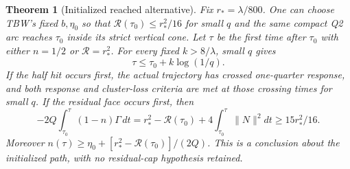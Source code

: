 \documentclass[11pt]{article}
\newtheorem{theorem}{Theorem}\newcommand{\E}{\mathbb E}
\begin{document}
\begin{theorem}[Initialized reached alternative]\label{an04rqtv1:alternative}
Fix $r_*=\lambda/800$. One can choose TBW's fixed $b,\eta_0$ so
that $\mathcal R(\tau_0)\le r_*^2/16$ for small $q$ and the same
compact Q2 arc reaches $\tau_0$ inside its strict vertical cone.
Let $\tau$ be the first time after $\tau_0$ with either $n=1/2$
or $\mathcal R=r_*^2$. For every fixed $k>8/\lambda$, small $q$ gives
\[
 \tau\le\tau_0+k\log(1/q).
\]
If the half hit occurs first, the actual trajectory has crossed
one-quarter response, and both response and cluster-loss criteria
are met at those crossing times for small $q$. If the residual
face occurs first, then
\begin{equation}\label{an04rqtv1:paidexit}
 -2Q\int_{\tau_0}^{\tau}(1-n)\Gamma\,dt
 =r_*^2-\mathcal R(\tau_0)+4\int_{\tau_0}^{\tau}\|N\|^2dt
 \ge15r_*^2/16 .
\end{equation}
Moreover $n(\tau)\ge\eta_0+[r_*^2-\mathcal R(\tau_0)]/(2Q)$.
This is a conclusion about the initialized path, with no
residual-cap hypothesis retained.
\end{theorem}
\end{document}
